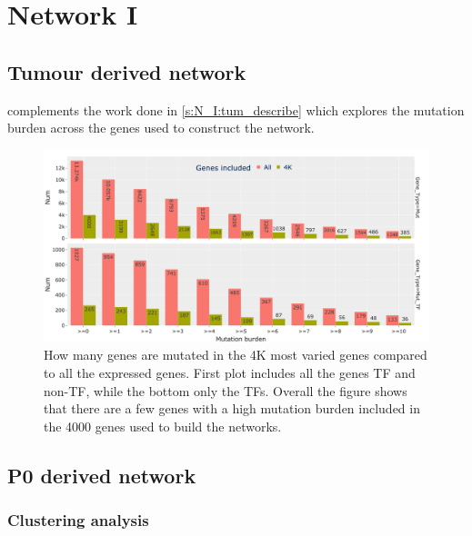 \chapter{Network I}

\section{Tumour derived network} \label{s:ap:tum_net}

 complements the work done in \cref{s:N_I:tum_describe} which explores the mutation burden across the genes used to construct the network.

\begin{figure}[H]    
    \centering
    \includegraphics[width=1.0\textwidth,keepaspectratio]{Sections/Network_I/Resources/Tum_network/MutTF_representation_4K-all.png}
    \caption{How many genes are mutated in the 4K most varied genes compared to all the expressed genes. First plot includes all the genes TF and non-TF, while the bottom only the TFs. Overall the figure shows that there are a few genes with a high mutation burden included in the 4000 genes used to build the networks.}
    \label{fig:N_I:mut_rep_tum}
\end{figure}


\section{P0 derived network} \label{s:ap:P0}

\subsection{Clustering analysis} \label{s:ap:P0_cs_analysis}


